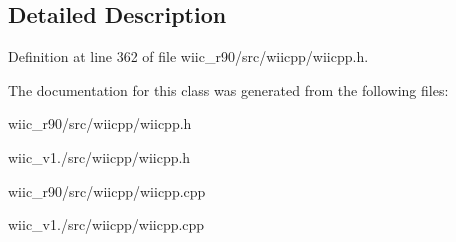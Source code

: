 \subsection{Detailed Description}


Definition at line 362 of file wiic\-\_\-r90/src/wiicpp/wiicpp.\-h.



The documentation for this class was generated from the following files\-:\begin{DoxyCompactItemize}
\item 
wiic\-\_\-r90/src/wiicpp/wiicpp.\-h\item 
wiic\-\_\-v1./src/wiicpp/wiicpp.\-h\item 
wiic\-\_\-r90/src/wiicpp/wiicpp.\-cpp\item 
wiic\-\_\-v1./src/wiicpp/wiicpp.\-cpp\end{DoxyCompactItemize}
